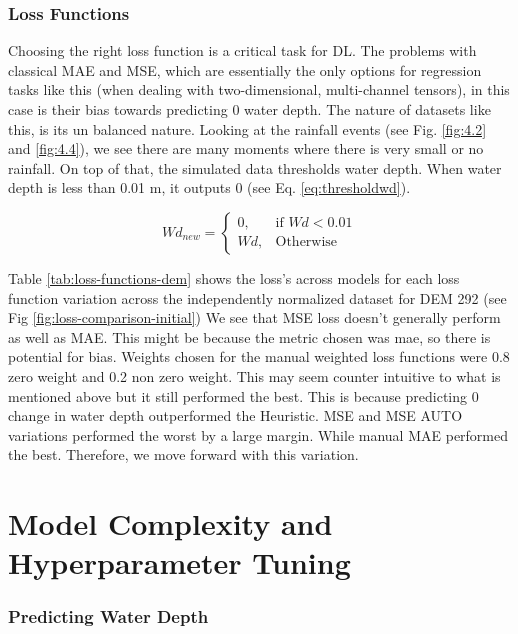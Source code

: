 \subsubsection*{Loss Functions}
Choosing the right loss function is a critical task for DL. The problems with classical MAE and MSE, which are essentially the only options for regression tasks like this (when dealing with two-dimensional, multi-channel tensors), in this case is their bias towards predicting 0 water depth. The nature of datasets like this, is its un balanced nature. Looking at the rainfall events (see Fig. \ref{fig:4.2} and \ref{fig:4.4}), we see there are many moments where there is very small or no rainfall. On top of that, the simulated data thresholds water depth. When water depth is less than 0.01 m, it outputs 0 (see Eq. \ref{eq:thresholdwd}).

\begin{equation}
	\label{eq:thresholdwd}
	Wd_{new} = \begin{cases}
		0, & \text{if } Wd < 0.01 \\
		Wd, & \text{Otherwise}
	\end{cases}
\end{equation}

Table \ref{tab:loss-functions-dem} shows the loss's across models for each loss function variation across the independently normalized dataset for DEM 292 (see Fig \ref{fig:loss-comparison-initial}) We see that MSE loss doesn't generally perform as well as MAE. This might be because the metric chosen was mae, so there is potential for bias. Weights chosen for the  manual weighted loss functions were 0.8 zero weight and 0.2 non zero weight. This may seem counter intuitive to what is mentioned above but it still performed the best. This is because predicting 0 change in water depth outperformed the Heuristic. MSE and MSE AUTO variations performed the worst by a large margin. While manual MAE performed the best. Therefore, we move forward with this variation.

\section{Model Complexity and Hyperparameter Tuning}
\subsubsection*{Predicting Water Depth}


 